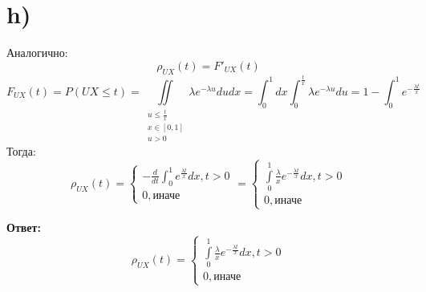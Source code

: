 \documentclass[a4paper,12pt]{article}
\begin{document}
\section*{h)} 
Аналогично:
\[
\rho_{UX}(t) = F'_{UX}(t)
\]
\[
F_{UX}(t) = P(UX \leq t) = \iint\limits_{\begin{matrix}
u \leq \frac{t}{x} \\
x \in [0, 1] \\
u > 0
\end{matrix}} \lambda e^{-\lambda u} du dx 
=\int_0^1 dx \int_0^{\frac{t}{x}} \lambda e^{-\lambda u} du  = 1-  \int_0^1 e^{-\frac{\lambda t}{x}} 
\]
Тогда:
\[
\rho_{UX}(t) =  \begin{cases} -\frac{d}{dt} \int_0^1 e^{\frac{\lambda t}{x}}dx, t > 0 \\
0, \text{иначе}  \end{cases}= \begin{cases} \int\limits_0^1 \frac{\lambda}{x} e^{-\frac{\lambda t}{x}} dx, t > 0\\
0, \text{иначе}
\end{cases}
\]
\begin{center}
\textbf{Ответ: } 
\[
\rho_{UX}(t) = 
\begin{cases} \int\limits_0^1 \frac{\lambda}{x} e^{-\frac{\lambda t}{x}} dx, t > 0\\
0, \text{иначе}
\end{cases}
\]
\end{center}
\clearpage
\end{document}
